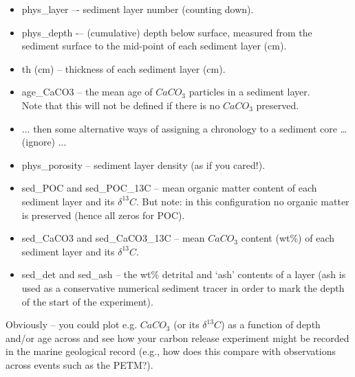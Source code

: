 \vspace{1mm}
\begin{itemize}[noitemsep]
\item \textsf{\footnotesize phys\_layer } –- sediment layer number (counting down).
\item \textsf{\footnotesize phys\_depth } -– (cumulative) depth below surface, measured from the sediment surface to the mid-point of each sediment layer (cm).
\item \textsf{\footnotesize th (cm) } -- thickness of each sediment layer (cm).
\item \textsf{\footnotesize age\_CaCO3 } -- the mean age of \(CaCO_{3}\) particles in a sediment layer.
\\Note that this will not be defined if there is no \(CaCO_{3}\) preserved.
\item \textsf{\footnotesize ... } then some alternative ways of assigning a chronology to a sediment core … (ignore) ...
\item \textsf{\footnotesize phys\_porosity  } -- sediment layer density (as if you cared!).
\item \textsf{\footnotesize sed\_POC } and \textsf{\footnotesize sed\_POC\_13C } -- mean organic matter content of each sediment layer and its \(\delta^{13} C\). But note: in this configuration no organic matter is preserved (hence all zeros for POC).
\item \textsf{\footnotesize sed\_CaCO3} and \textsf{\footnotesize sed\_CaCO3\_13C } -- mean \(CaCO_{3}\) content (wt\%) of each sediment layer and its \(\delta^{13} C\).
\item \textsf{\footnotesize sed\_det } and \textsf{\footnotesize sed\_ash } -- the wt\% detrital and ‘ash’ contents of a layer (ash is used as a conservative numerical sediment tracer in order to mark the depth of the start of the experiment).
\end{itemize}
\vspace{1mm}

\noindent Obviously – you could plot e.g. \(CaCO_{3}\) (or its \(\delta^{13}C\)) as a function of depth and/or age across and see how your carbon release experiment might be recorded in the marine geological record (e.g., how does this compare with observations across events such as the PETM?).

